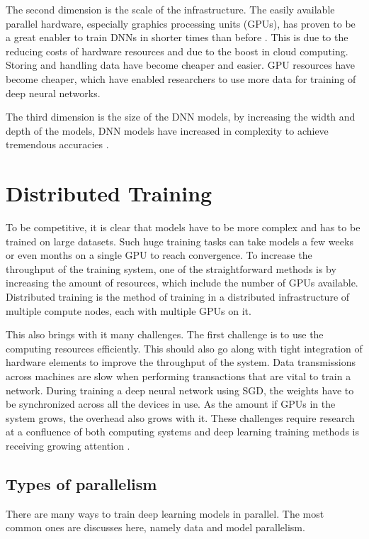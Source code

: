 The second dimension is the scale of the infrastructure. The easily available parallel hardware, especially graphics processing units (GPUs), has proven to be a great enabler to train DNNs in shorter times than before \cite{ZhangPoseidon:Clusters}. This is due to the reducing costs of hardware resources and due to the boost in cloud computing. Storing and handling data have become cheaper and easier. GPU resources have become cheaper, which have enabled researchers to use more data for training of deep neural networks. 

The third dimension is the size of the DNN models, by increasing the width and depth of the models, DNN models have increased in complexity to achieve tremendous accuracies \cite{DeanLargeNetworks}. 

\section{Distributed Training}
To be competitive, it is clear that models have to be more complex and has to be trained on large datasets. Such huge training tasks can take models a few weeks or even months on a single GPU to reach convergence. To increase the throughput of the training system, one of the straightforward  methods is by increasing the amount of resources, which include the number of GPUs available. Distributed training is the method of training in a distributed infrastructure of multiple compute nodes, each with multiple GPUs on it\cite{Langer2020DistributedPerspective}. 

This also brings with it many challenges. The first challenge is to use the computing resources efficiently. This should also go along with tight integration of hardware elements to improve the throughput of the system. Data transmissions across machines are slow when performing transactions that are vital to train a network. During training a deep neural network using SGD, the weights have to be synchronized across all the devices in use. As the amount if GPUs in the system grows, the overhead also grows with it. These challenges require research at a confluence of both computing systems and deep learning training methods is receiving growing attention \cite{Xiao2018Gandiva:Learning, Mai2020KungFu:Adaptive, Chilimbi2014ProjectSystem, CuiGeePS:Server, Peng2018Optimus:Clusters}.

\subsection{Types of parallelism}
There are many ways to train deep learning models in parallel. The most common ones are discusses here, namely data and model parallelism.

